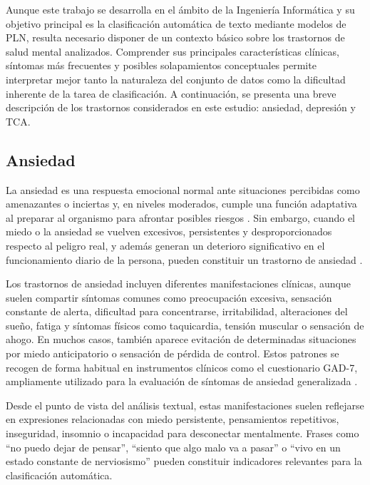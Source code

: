 Aunque este trabajo se desarrolla en el ámbito de la Ingeniería Informática y su objetivo principal es la clasificación automática de texto mediante modelos de \ac{PLN}, resulta necesario disponer de un contexto básico sobre los trastornos de salud mental analizados. Comprender sus principales características clínicas, síntomas más frecuentes y posibles solapamientos conceptuales permite interpretar mejor tanto la naturaleza del conjunto de datos como la dificultad inherente de la tarea de clasificación. A continuación, se presenta una breve descripción de los trastornos considerados en este estudio: ansiedad, depresión y \ac{TCA}.

\subsection{Ansiedad}

La ansiedad es una respuesta emocional normal ante situaciones percibidas como amenazantes o inciertas y, en niveles moderados, cumple una función adaptativa al preparar al organismo para afrontar posibles riesgos \cite{belloch_manual_2020}. Sin embargo, cuando el miedo o la ansiedad se vuelven excesivos, persistentes y desproporcionados respecto al peligro real, y además generan un deterioro significativo en el funcionamiento diario de la persona, pueden constituir un trastorno de ansiedad \cite{american_psychiatric_association_diagnostic_2022}.

Los trastornos de ansiedad incluyen diferentes manifestaciones clínicas, aunque suelen compartir síntomas comunes como preocupación excesiva, sensación constante de alerta, dificultad para concentrarse, irritabilidad, alteraciones del sueño, fatiga y síntomas físicos como taquicardia, tensión muscular o sensación de ahogo. En muchos casos, también aparece evitación de determinadas situaciones por miedo anticipatorio o sensación de pérdida de control. Estos patrones se recogen de forma habitual en instrumentos clínicos como el cuestionario \ac{GAD-7}, ampliamente utilizado para la evaluación de síntomas de ansiedad generalizada \cite{spitzer_brief_2006}.

Desde el punto de vista del análisis textual, estas manifestaciones suelen reflejarse en expresiones relacionadas con miedo persistente, pensamientos repetitivos, inseguridad, insomnio o incapacidad para desconectar mentalmente. Frases como “no puedo dejar de pensar”, “siento que algo malo va a pasar” o “vivo en un estado constante de nerviosismo” pueden constituir indicadores relevantes para la clasificación automática.

